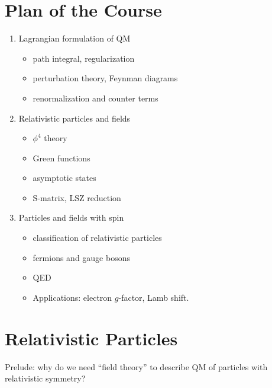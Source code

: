 \begin{center}
\end{center}

\section{Plan of the Course}

\begin{enumerate}
\item Lagrangian formulation of QM
\begin{itemize}
  \item path integral, regularization
  \item perturbation theory, Feynman diagrams
  \item renormalization and counter terms
\end{itemize}

\item Relativistic particles and fields
\begin{itemize}
  \item $\phi^4$ theory
  \item Green functions
  \item asymptotic states
  \item S-matrix, LSZ reduction
\end{itemize}

\item Particles and fields with spin
\begin{itemize}
  \item classification of relativistic particles
  \item fermions and gauge bosons
  \item QED
  \item Applications: electron $g$-factor, Lamb shift.
\end{itemize}
\end{enumerate}

\section{Relativistic Particles}

Prelude: why do we need ``field theory'' to describe QM of particles with
relativistic symmetry?

